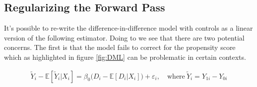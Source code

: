 \documentclass[a4paper,12pt]{article}
\begin{document}

\subsection{Regularizing the Forward Pass}
It's possible to re-write the difference-in-difference model with controls as a linear version of the following estimator. Doing to we see that there are two potential concerns. The first is that the model fails to correct for the propensity score which as highlighted in figure \ref{fig:DML} can be problematic in certain contexts.  

\begin{align*}
\tilde{Y}_i - \mathbb{E}[ \tilde{Y}_i | X_i] = \beta_0 \big(D_i - \mathbb{E}[D_i |X_i]\big) + \varepsilon_i, \quad \textrm{where} \ \tilde{Y}_i =  Y_{1i} - Y_{0i} 
\end{align*}
\end{document}

